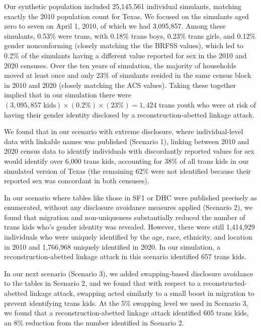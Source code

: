 \documentclass{jpc} %
\theoremstyle{plain}\newtheorem{satz}[thm]{Satz} %
\begin{document}
Our synthetic population included 25,145,561 individual simulants, matching exactly the 2010 population count for Texas.  We focused on the simulants aged zero to seven on April 1, 2010, of which we had 3,095,857.
Among these simulants, 0.53\% were trans, with 0.18\% trans boys, 0.23\% trans girls, and 0.12\% gender nonconforming (closely matching the the BRFSS values), which led to 0.2\% of the simulants having a different value reported for sex in the 2010 and 2020 censuses.
Over the ten years of simulation, the majority of households moved at least once and only 23\% of simulants resided in the same census block in 2010 and 2020 (closely matching the ACS values).
Taking these together implied that in our simulation there were $(3,095,857 \text{ kids}) \times (0.2\%) \times (23\%) = 1,424$ trans youth who were at risk of having their gender identity disclosed by a reconstruction-abetted linkage attack.

We found that in our scenario with extreme disclosure, where individual-level data with linkable names was published (Scenario 1), linking between 2010 and 2020 census data to identify individuals with discordantly reported values for sex would identify over 6,000 trans kids, accounting for 38\% of all trans kids in our simulated version of Texas (the remaining 62\% were not identified because their reported sex was concordant in both censuses).

In our scenario where tables like those in SF1 or DHC were published precisely as enumerated, without any disclosure avoidance measures applied (Scenario 2), we found that migration and non-uniqueness substantially reduced the number of trans kids who's gender identity was revealed.  However, there were still 1,414,929 individuals who were uniquely identified by the age, race, ethnicity, and location in 2010 and 1,766,968 uniquely identified in 2020.  In our simulation, a reconstruction-abetted linkage attack in this scenario identified 657 trans kids.

In our next scenario (Scenario 3), we added swapping-based disclosure avoidance to the tables in Scenario 2, and we found that with respect to a reconstructed-abetted linkage attack, swapping acted similarly to a small boost in migration to prevent identifying trans kids.  At the 5\% swapping level we used in Scenario 3, we found that a reconstruction-abetted linkage attack identified 605 trans kids, an 8\% reduction from the number identified in Scenario 2.
\end{document}
